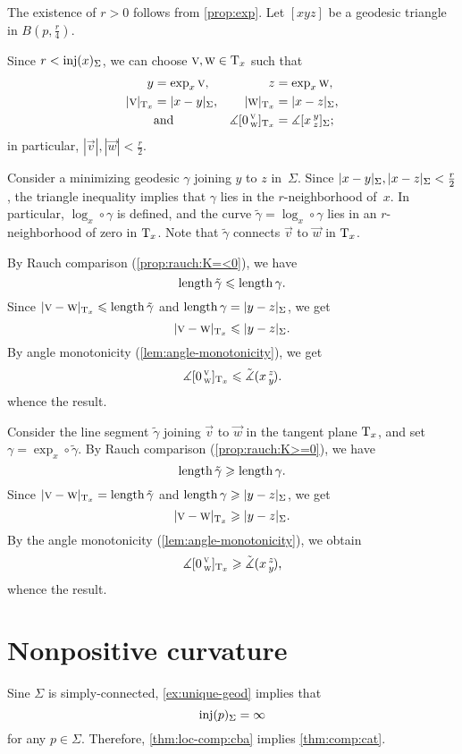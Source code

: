 The existence of $r>0$ follows from \ref{prop:exp}.
Let $[xyz]$ be a geodesic triangle in $B(p,\tfrac{r}4)$.

Since $r<\mathop{\rm inj}\nolimits(x)_\Sigma$, we can choose $\text{\sc{v}},\text{\sc{w}}\in\mathrm{T}_x$ such that 
\begin{align*}
y&=\exp_x\vec v,
& 
z&=\exp_x\vec w,
\\
|\vec v|_{\T_x}&=\dist{x}{y}\Sigma,&
|\vec w|_{\T_x}&=\dist{x}{z}\Sigma,
\\
&\text{and}
&\measuredangle\hinge 0{\vec v}{\vec w}_{\T_x}&=\measuredangle\hinge xyz_\Sigma;
\end{align*}
in particular, $|\vec v|, |\vec w|< \tfrac r2$.

Consider a minimizing geodesic $\gamma$ joining $y$ to $z$ in~$\Sigma$.
Since $\dist{x}{y}{\Sigma},\dist{x}{z}{\Sigma}\z<\tfrac r2$, the triangle inequality implies that $\gamma$ lies in the $r$-neighborhood of~$x$.
In particular, $\log_x\circ\gamma$ is defined, and the curve
$\tilde \gamma=\log_x\circ\gamma$ lies in an $r$-neighborhood of zero in $\mathrm{T}_x$.
Note that $\tilde\gamma$ connects $\vec v$ to $\vec w$ in $\mathrm{T}_x$.

By Rauch comparison (\ref{prop:rauch:K=<0}), we have
\[\mathop{\rm length}\nolimits \tilde \gamma\leqslant \mathop{\rm length}\nolimits\gamma.\]
Since $\dist{\vec v}{\vec w}{\T_x}\le\length\tilde \gamma$ and $\length\gamma=\dist{y}{z}{\Sigma}$, we get 
\[\dist{\vec v}{\vec w}{\T_x}\le \dist{y}{z}\Sigma.\]
By angle monotonicity (\ref{lem:angle-monotonicity}), we get
\[\measuredangle[0\,{}^{\text{\sc{v}}}_{\text{\sc{w}}}]_{\mathrm{T}_x}\leqslant \tilde\measuredangle(x\,{}^{z}_{y}\hspace{-0.2ex}).\]
whence the result.

Consider the line segment $\tilde \gamma$ joining $\vec v$ to $\vec w$ in the tangent plane $\mathrm{T}_x$, and set $\gamma=\exp_x\circ\tilde \gamma$.
By Rauch comparison (\ref{prop:rauch:K>=0}), we have
\[\mathop{\rm length}\nolimits \tilde \gamma\geqslant\mathop{\rm length}\nolimits\gamma.\]
Since $\dist{\vec v}{\vec w}{\T_x}=\length\tilde \gamma$ and $\length\gamma\ge\dist{y}{z}\Sigma$, we get 
\[\dist{\vec v}{\vec w}{\T_x}\ge \dist{y}{z}\Sigma.\]
By the angle monotonicity (\ref{lem:angle-monotonicity}), we obtain
\[\measuredangle[0\,{}^{\text{\sc{v}}}_{\text{\sc{w}}}]_{\mathrm{T}_x}\geqslant\tilde\measuredangle(x\,{}^{z}_{y}\hspace{-0.2ex}),\]
whence the result.
\qeds

\section{Nonpositive curvature}\label{sec:nonpos-comp}

Sine $\Sigma$ is simply-connected, \ref{ex:unique-geod} implies that 
\[\mathop{\rm inj}\nolimits(p)_\Sigma=\infty\]
for any $p\in\Sigma$.
Therefore, \ref{thm:loc-comp:cba} implies \ref{thm:comp:cat}.
\qeds


